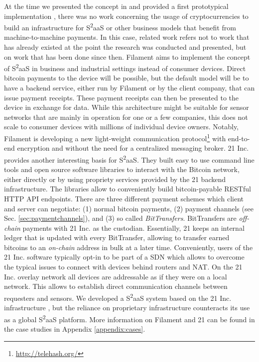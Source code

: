 At the time we presented the concept in \parencite{DBLP:journals/corr/NoyenVWF14} and provided a first prototypical implementation \parencite{Worner:2014:YSE:2638728.2638786}, there was no work concerning the usage of cryptocurrencies to build an infrastructure for S\textsuperscript{2}aaS or other business models that benefit from machine-to-machine payments.
In this case, related work refers not to work that has already existed at the point the research was conducted and presented, but on work that has been done since then. 
Filament aims to implement the concept of S\textsuperscript{2}aaS in business and industrial settings instead of consumer devices. Direct bitcoin payments to the device will be possible, but the default model will be to have a backend service, either run by Filament or by the client company, that can issue payment receipts. These payment receipts can then be presented to the device in exchange for data. While this architecture might be suitable for sensor networks that are mainly in operation for one or a few companies, this does not scale to consumer devices with millions of individual device owners. Notably, Filament is developing a new light-weight communication protocol\footnote{\url{http://telehash.org/}} with end-to-end encryption and without the need for a centralized messaging broker. 21 Inc. provides another interesting basis for S\textsuperscript{2}aaS. They built easy to use command line tools and open source software libraries to interact with the Bitcoin network, either directly or by using propriety services provided by the 21 backend infrastructure. The libraries allow to conveniently build bitcoin-payable \ac{REST}ful \ac{HTTP} \ac{API} endpoints. There are three different payment schemes which client and server can negotiate: (1) normal bitcoin payments, (2) payment channels (see Sec. \ref{sec:paymentchannels}), and (3) so called \emph{BitTransfers}. BitTransfers are \emph{off-chain} payments with 21 Inc. as the custodian. Essentially, 21 keeps an internal ledger that is updated with every BitTransfer, allowing to transfer earned bitcoins to an \emph{on-chain} address in bulk at a later time. Conveniently, users of the 21 Inc. software typically opt-in to be part of a \ac{SDN} which allows to overcome the typical issues to connect with devices behind routers and \ac{NAT}. On the 21 Inc. overlay network all devices are addressable as if they were on a local network. This allows to establish direct communication channels between requesters and sensors. We developed a S\textsuperscript{2}aaS system based on the 21 Inc. infrastructure \parencite{worner2016design}, but the reliance on proprietary infrastructure counteracts its use as a global S\textsuperscript{2}aaS platform. More information on Filament and 21 can be found in the case studies in Appendix \ref{appendix:cases}.

